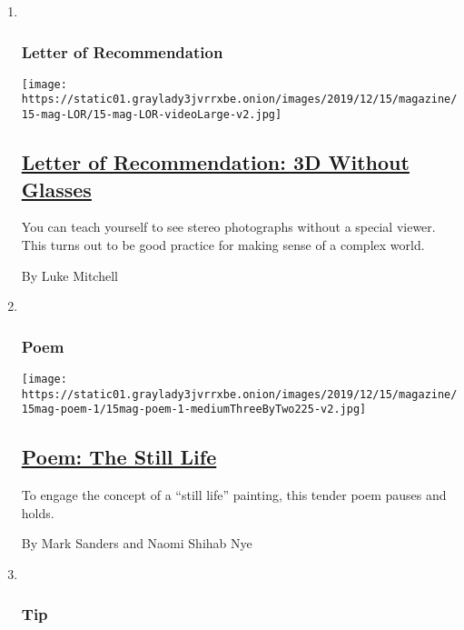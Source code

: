 \begin{enumerate}
\def\labelenumi{\arabic{enumi}.}
\item ~
  \hypertarget{letter-of-recommendation}{%
  \subsubsection{Letter of
  Recommendation}\label{letter-of-recommendation}}

  \texttt{[image: https://static01.graylady3jvrrxbe.onion/images/2019/12/15/magazine/15-mag-LOR/15-mag-LOR-videoLarge-v2.jpg]}

  \hypertarget{letter-of-recommendation-3d-without-glasses}{%
  \subsection{\texorpdfstring{\href{/2019/12/11/magazine/free-viewing-stereo-photography.html}{Letter
  of Recommendation: 3D Without
  Glasses}}{Letter of Recommendation: 3D Without Glasses}}\label{letter-of-recommendation-3d-without-glasses}}

  You can teach yourself to see stereo photographs without a special
  viewer. This turns out to be good practice for making sense of a
  complex world.

  By Luke Mitchell
\item ~
  \hypertarget{poem}{%
  \subsubsection{Poem}\label{poem}}

  \texttt{[image: https://static01.graylady3jvrrxbe.onion/images/2019/12/15/magazine/15mag-poem-1/15mag-poem-1-mediumThreeByTwo225-v2.jpg]}

  \hypertarget{poem-the-still-life}{%
  \subsection{\texorpdfstring{\href{/2019/12/12/magazine/poem-the-still-life.html}{Poem:
  The Still Life}}{Poem: The Still Life}}\label{poem-the-still-life}}

  To engage the concept of a ``still life'' painting, this tender poem
  pauses and holds.

  By Mark Sanders and Naomi Shihab Nye
\item ~
  \hypertarget{tip}{%
  \subsubsection{Tip}\label{tip}}


\end{enumerate}
